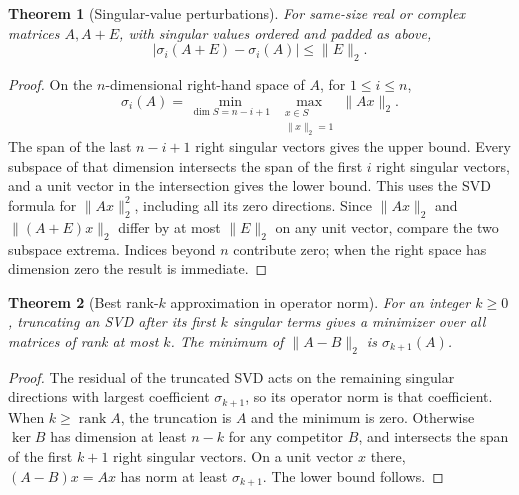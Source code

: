 \documentclass[11pt,oneside,openany]{book}
\theoremstyle{plain}
\newtheorem{theorem}{Theorem}[chapter]
\theoremstyle{definition}
\theoremstyle{remark}
\begin{document}
\begin{theorem}[Singular-value perturbations]\label{p206:W40}
For same-size real or complex matrices \(A,A+E\), with
singular values ordered and padded as above,
\[
                |\sigma_i(A+E)-\sigma_i(A)|\le\|E\|_2 .
\]
\end{theorem}
\begin{proof}
On the \(n\)-dimensional right-hand space of \(A\), for
\(1\le i\le n\),
\[
 \sigma_i(A)
     =\min_{\dim S=n-i+1}\ \max_{\substack{x\in S\\\|x\|_2=1}}\|Ax\|_2 .
\]
The span of the last \(n-i+1\) right singular vectors gives
the upper bound. Every subspace of that dimension intersects
the span of the first \(i\) right singular vectors, and a unit
vector in the intersection gives the lower bound. This uses
the SVD formula for \(\|Ax\|_2^2\), including all its zero
directions. Since \(\|Ax\|_2\) and \(\|(A+E)x\|_2\) differ
by at most \(\|E\|_2\) on any unit vector, compare the
two subspace extrema. Indices beyond \(n\) contribute zero;
when the right space has dimension zero the result is immediate.
\end{proof}

\begin{theorem}[Best rank-\(k\) approximation in operator norm]
\label{p206:W41}
For an integer \(k\ge0\), truncating an SVD after its first
\(k\) singular terms gives a minimizer over all matrices of
rank at most \(k\). The minimum of \(\|A-B\|_2\) is
\(\sigma_{k+1}(A)\).
\end{theorem}
\begin{proof}
The residual of the truncated SVD acts on the remaining singular
directions with largest coefficient \(\sigma_{k+1}\), so its
operator norm is that coefficient. When \(k\ge\operatorname{rank}A\),
the truncation is \(A\) and the minimum is zero.
Otherwise \(\ker B\) has dimension at least \(n-k\) for any
competitor \(B\), and intersects the span of the first \(k+1\)
right singular vectors. On a unit vector \(x\) there,
\((A-B)x=Ax\) has norm at least \(\sigma_{k+1}\).
The lower bound follows.
\end{proof}
\end{document}

